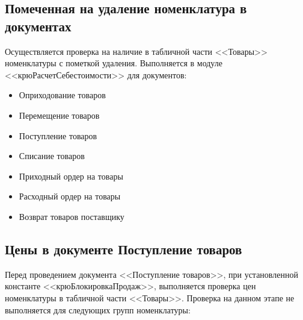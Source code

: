 \subsection{Помеченная на удаление номенклатура в документах}\label{1005}

Осуществляется проверка на наличие в табличной части <<Товары>> номенклатуры с пометкой удаления.
Выполняется в модуле <<крюРасчетСебестоимости>> для документов:


\begin{itemize}
	\item Оприходование товаров
	\item Перемещение товаров
	\item Поступление товаров
	\item Списание товаров
	\item Приходный ордер на товары
	\item Расходный ордер на товары
	\item Возврат товаров поставщику

\end{itemize}

\subsection{Цены в документе Поступление товаров}\label{1006}

Перед проведением документа <<Поступление товаров>>, при установленной константе <<крюБлокировкаПродаж>>, выполняется проверка цен номенклатуры в табличной части <<Товары>>. Проверка на данном этапе не выполняется для следующих групп номенклатуры:

